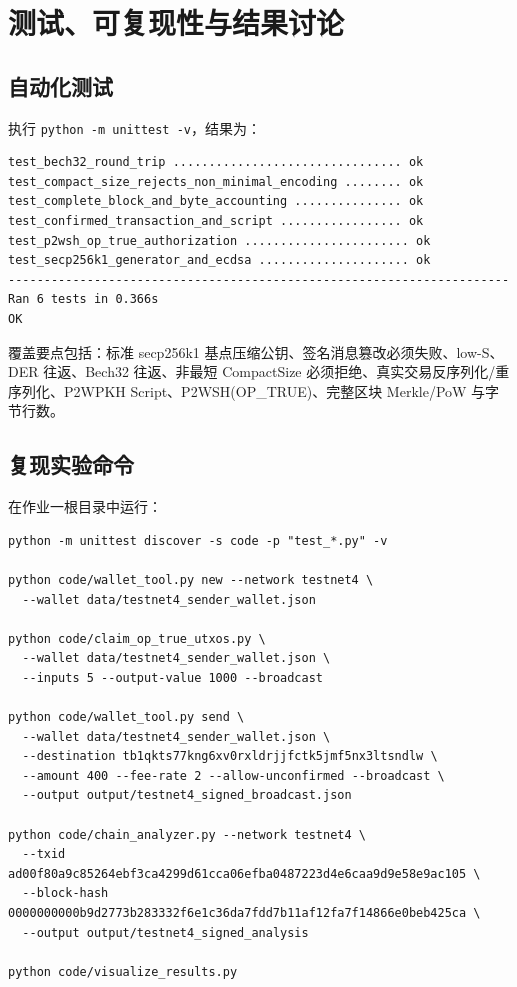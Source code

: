 \documentclass[UTF8,a4paper,zihao=-4]{ctexart}
\begin{document}
\section{测试、可复现性与结果讨论}

\subsection{自动化测试}

执行 \texttt{python -m unittest -v}，结果为：

\begin{lstlisting}[style=datastyle]
test_bech32_round_trip ................................ ok
test_compact_size_rejects_non_minimal_encoding ........ ok
test_complete_block_and_byte_accounting ............... ok
test_confirmed_transaction_and_script ................. ok
test_p2wsh_op_true_authorization ....................... ok
test_secp256k1_generator_and_ecdsa ..................... ok
----------------------------------------------------------------------
Ran 6 tests in 0.366s
OK
\end{lstlisting}

覆盖要点包括：标准 secp256k1 基点压缩公钥、签名消息篡改必须失败、low-S、DER 往返、Bech32 往返、非最短 CompactSize 必须拒绝、真实交易反序列化/重序列化、P2WPKH Script、P2WSH(OP\_TRUE)、完整区块 Merkle/PoW 与字节行数。

\subsection{复现实验命令}

在作业一根目录中运行：

\begin{lstlisting}[style=datastyle]
python -m unittest discover -s code -p "test_*.py" -v

python code/wallet_tool.py new --network testnet4 \
  --wallet data/testnet4_sender_wallet.json

python code/claim_op_true_utxos.py \
  --wallet data/testnet4_sender_wallet.json \
  --inputs 5 --output-value 1000 --broadcast

python code/wallet_tool.py send \
  --wallet data/testnet4_sender_wallet.json \
  --destination tb1qkts77kng6xv0rxldrjjfctk5jmf5nx3ltsndlw \
  --amount 400 --fee-rate 2 --allow-unconfirmed --broadcast \
  --output output/testnet4_signed_broadcast.json

python code/chain_analyzer.py --network testnet4 \
  --txid ad00f80a9c85264ebf3ca4299d61cca06efba0487223d4e6caa9d9e58e9ac105 \
  --block-hash 0000000000b9d2773b283332f6e1c36da7fdd7b11af12fa7f14866e0beb425ca \
  --output output/testnet4_signed_analysis

python code/visualize_results.py
\end{lstlisting}
\end{document}
